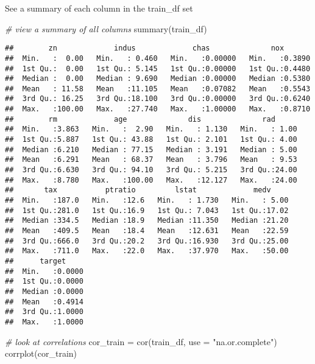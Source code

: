 \documentclass[
]{article}
\newenvironment{Shaded}{\begin{snugshade}}{\end{snugshade}}
\newcommand{\AttributeTok}[1]{\textcolor[rgb]{0.77,0.63,0.00}{#1}}
\newcommand{\CommentTok}[1]{\textcolor[rgb]{0.56,0.35,0.01}{\textit{#1}}}
\newcommand{\FunctionTok}[1]{\textcolor[rgb]{0.00,0.00,0.00}{#1}}
\newcommand{\NormalTok}[1]{#1}
\newcommand{\OtherTok}[1]{\textcolor[rgb]{0.56,0.35,0.01}{#1}}
\newcommand{\StringTok}[1]{\textcolor[rgb]{0.31,0.60,0.02}{#1}}
\begin{document}
See a summary of each column in the train\_df set

\begin{Shaded}
\begin{Highlighting}[]
\CommentTok{\# view a summary of all columns}
\FunctionTok{summary}\NormalTok{(train\_df)}
\end{Highlighting}
\end{Shaded}

\begin{verbatim}
##        zn             indus             chas              nox        
##  Min.   :  0.00   Min.   : 0.460   Min.   :0.00000   Min.   :0.3890  
##  1st Qu.:  0.00   1st Qu.: 5.145   1st Qu.:0.00000   1st Qu.:0.4480  
##  Median :  0.00   Median : 9.690   Median :0.00000   Median :0.5380  
##  Mean   : 11.58   Mean   :11.105   Mean   :0.07082   Mean   :0.5543  
##  3rd Qu.: 16.25   3rd Qu.:18.100   3rd Qu.:0.00000   3rd Qu.:0.6240  
##  Max.   :100.00   Max.   :27.740   Max.   :1.00000   Max.   :0.8710  
##        rm             age              dis              rad       
##  Min.   :3.863   Min.   :  2.90   Min.   : 1.130   Min.   : 1.00  
##  1st Qu.:5.887   1st Qu.: 43.88   1st Qu.: 2.101   1st Qu.: 4.00  
##  Median :6.210   Median : 77.15   Median : 3.191   Median : 5.00  
##  Mean   :6.291   Mean   : 68.37   Mean   : 3.796   Mean   : 9.53  
##  3rd Qu.:6.630   3rd Qu.: 94.10   3rd Qu.: 5.215   3rd Qu.:24.00  
##  Max.   :8.780   Max.   :100.00   Max.   :12.127   Max.   :24.00  
##       tax           ptratio         lstat             medv      
##  Min.   :187.0   Min.   :12.6   Min.   : 1.730   Min.   : 5.00  
##  1st Qu.:281.0   1st Qu.:16.9   1st Qu.: 7.043   1st Qu.:17.02  
##  Median :334.5   Median :18.9   Median :11.350   Median :21.20  
##  Mean   :409.5   Mean   :18.4   Mean   :12.631   Mean   :22.59  
##  3rd Qu.:666.0   3rd Qu.:20.2   3rd Qu.:16.930   3rd Qu.:25.00  
##  Max.   :711.0   Max.   :22.0   Max.   :37.970   Max.   :50.00  
##      target      
##  Min.   :0.0000  
##  1st Qu.:0.0000  
##  Median :0.0000  
##  Mean   :0.4914  
##  3rd Qu.:1.0000  
##  Max.   :1.0000
\end{verbatim}

\begin{Shaded}
\begin{Highlighting}[]
\CommentTok{\# look at correlations }
\NormalTok{cor\_train }\OtherTok{=} \FunctionTok{cor}\NormalTok{(train\_df,  }\AttributeTok{use =} \StringTok{"na.or.complete"}\NormalTok{)}
\FunctionTok{corrplot}\NormalTok{(cor\_train)}
\end{Highlighting}
\end{Shaded}
\end{document}
